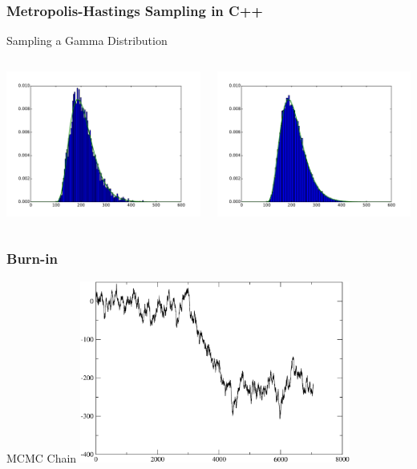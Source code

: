 \documentclass[mathserif]{beamer}
\begin{document}
\begin{frame}
\frametitle{Metropolis-Hastings Sampling in C++}

\begin{block}{Sampling a Gamma Distribution}
  \begin{columns}
    \includegraphics[width=3in]{figs/gamma.pdf}

  \includegraphics[width=3in]{figs/gamma_50k.pdf}
  \end{columns}
\end{block}

\end{frame}


\begin{frame}
\frametitle{Burn-in}

\begin{block}{MCMC Chain}
  \includegraphics[width=3.5in]{figs/example.pdf}
\end{block}

\end{frame}
\end{document}
